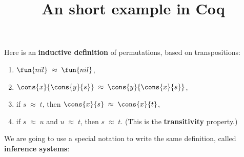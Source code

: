 \documentclass[wide]{slides}
\begin{document}
\begin{slide}
  \title{An short example in Coq}

  Here is an \textbf{inductive definition} of permutations, based on
  transpositions:
  \begin{enumerate}

    \item \label{perm:nil} \(\fun{nil} \;\approx\; \fun{nil}\),

    \item \label{perm:swap} \(\cons{x}{\cons{y}{s}} \;\approx\;
      \cons{y}{\cons{x}{s}}\),

    \item \label{perm:push} if \(s \;\approx\; t\), then \(\cons{x}{s}
      \;\approx\; \cons{x}{t}\),

    \item \label{perm:trans} if \(s \;\approx\; u\) and \(u
      \;\approx\; t\), then \(s \;\approx\; t\). (This is the
      \textbf{transitivity} property.)

  \end{enumerate}
  We are going to use a special notation to write the same definition,
  called \textbf{inference systems}:

\end{slide}
\end{document}
